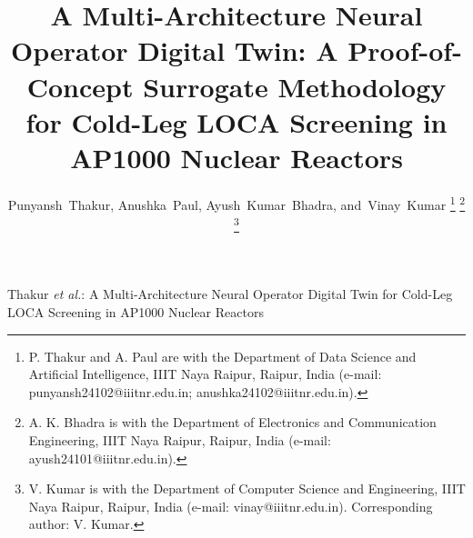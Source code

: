 \documentclass[journal]{IEEEtran}
\newcommand{\added}[1]{#1}
\begin{document}
\title{\added{A Multi-Architecture Neural Operator Digital Twin: A Proof-of-Concept Surrogate Methodology for Cold-Leg LOCA Screening in AP1000 Nuclear Reactors}}

\author{Punyansh~Thakur, Anushka~Paul, Ayush~Kumar~Bhadra, and~Vinay~Kumar
\thanks{P. Thakur and A. Paul are with the Department of Data Science and Artificial Intelligence, IIIT Naya Raipur, Raipur, India (e-mail: punyansh24102@iiitnr.edu.in; anushka24102@iiitnr.edu.in).}
\thanks{A. K. Bhadra is with the Department of Electronics and Communication Engineering, IIIT Naya Raipur, Raipur, India (e-mail: ayush24101@iiitnr.edu.in).}
\thanks{V. Kumar is with the Department of Computer Science and Engineering, IIIT Naya Raipur, Raipur, India (e-mail: vinay@iiitnr.edu.in). Corresponding author: V. Kumar.}}

%
{\added{Thakur \MakeLowercase{\textit{et al.}}: A Multi-Architecture Neural Operator Digital Twin for Cold-Leg LOCA Screening in AP1000 Nuclear Reactors}}

\maketitle
\end{document}
